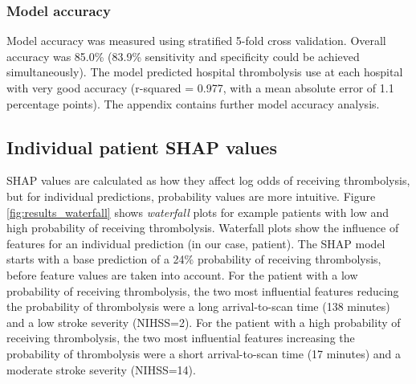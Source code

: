 
\subsubsection{Model accuracy}

Model accuracy was measured using stratified 5-fold cross validation. Overall accuracy was 85.0\% (83.9\% sensitivity and specificity could be achieved simultaneously). The model predicted hospital thrombolysis use at each hospital with very good accuracy (r-squared = 0.977, with a mean absolute error of 1.1 percentage points). The appendix contains further model accuracy analysis.

\subsection{Individual patient SHAP values}
SHAP values are calculated as how they affect log odds of receiving thrombolysis, but for individual predictions, probability values are more intuitive. Figure \ref{fig:results_waterfall} shows \emph{waterfall} plots for example patients with low and high probability of receiving thrombolysis. Waterfall plots show the influence of features for an individual prediction (in our case, patient). The SHAP model starts with a base prediction of a 24\% probability of receiving thrombolysis, before feature values are taken into account. For the patient with a low probability of receiving thrombolysis, the two most influential features reducing the probability of thrombolysis were a long arrival-to-scan time (138 minutes) and a low stroke severity (NIHSS=2). For the patient with a high probability of receiving thrombolysis, the two most influential features increasing the probability of thrombolysis were a short arrival-to-scan time (17 minutes) and a moderate stroke severity (NIHSS=14). 

